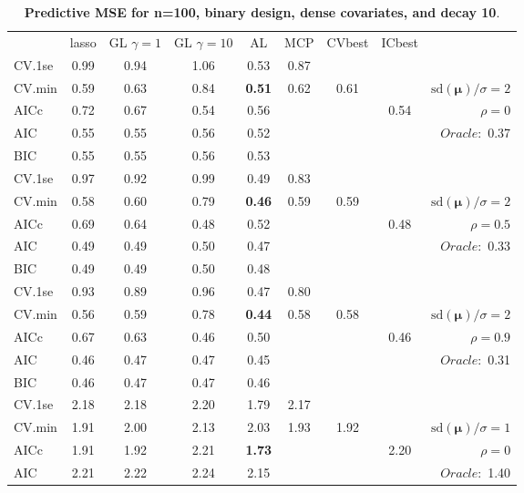 \begin{table}\vspace{-.5cm}
\caption[l]{ { \bf Predictive MSE for n=100, binary design, 
dense covariates, and  decay  10}.}
\vspace{-.5cm}
\footnotesize{}
\begin{center}
\begin{tabular}{l*{7}{c}|r}
 & lasso & GL $\gamma=1$ & GL $\gamma=10$ & AL & MCP  & CVbest & ICbest  \\
\cline{1-9}
CV.1se & 0.99 & 0.94 & 1.06 & 0.53 & 0.87 & & & \\
CV.min & 0.59 & 0.63 & 0.84 & {\bf 0.51} & 0.62 & 0.61 & & $\mathrm{sd}(\mathbf{\mu})/\sigma=2$ \\
AICc & 0.72 & 0.67 & 0.54 & 0.56 & & & 0.54 &  $\rho=0$ \\
AIC & 0.55 & 0.55 & 0.56 & 0.52 & & & &  \multirow{2}{*}{$Oracle: $ 0.37} \\
BIC & 0.55 & 0.55 & 0.56 & 0.53 & & & &  \\
 \hline 
CV.1se & 0.97 & 0.92 & 0.99 & 0.49 & 0.83 & & & \\
CV.min & 0.58 & 0.60 & 0.79 & {\bf 0.46} & 0.59 & 0.59 & & $\mathrm{sd}(\mathbf{\mu})/\sigma=2$ \\
AICc & 0.69 & 0.64 & 0.48 & 0.52 & & & 0.48 &  $\rho=0.5$ \\
AIC & 0.49 & 0.49 & 0.50 & 0.47 & & & &  \multirow{2}{*}{$Oracle: $ 0.33} \\
BIC & 0.49 & 0.49 & 0.50 & 0.48 & & & &  \\
 \hline 
CV.1se & 0.93 & 0.89 & 0.96 & 0.47 & 0.80 & & & \\
CV.min & 0.56 & 0.59 & 0.78 & {\bf 0.44} & 0.58 & 0.58 & & $\mathrm{sd}(\mathbf{\mu})/\sigma=2$ \\
AICc & 0.67 & 0.63 & 0.46 & 0.50 & & & 0.46 &  $\rho=0.9$ \\
AIC & 0.46 & 0.47 & 0.47 & 0.45 & & & &  \multirow{2}{*}{$Oracle: $ 0.31} \\
BIC & 0.46 & 0.47 & 0.47 & 0.46 & & & &  \\
 \hline 
CV.1se & 2.18 & 2.18 & 2.20 & 1.79 & 2.17 & & & \\
CV.min & 1.91 & 2.00 & 2.13 & 2.03 & 1.93 & 1.92 & & $\mathrm{sd}(\mathbf{\mu})/\sigma=1$ \\
AICc & 1.91 & 1.92 & 2.21 & {\bf 1.73} & & & 2.20 &  $\rho=0$ \\
AIC & 2.21 & 2.22 & 2.24 & 2.15 & & & &  \multirow{2}{*}{$Oracle: $ 1.40} \\

\end{tabular}
\end{center}
\end{table}
